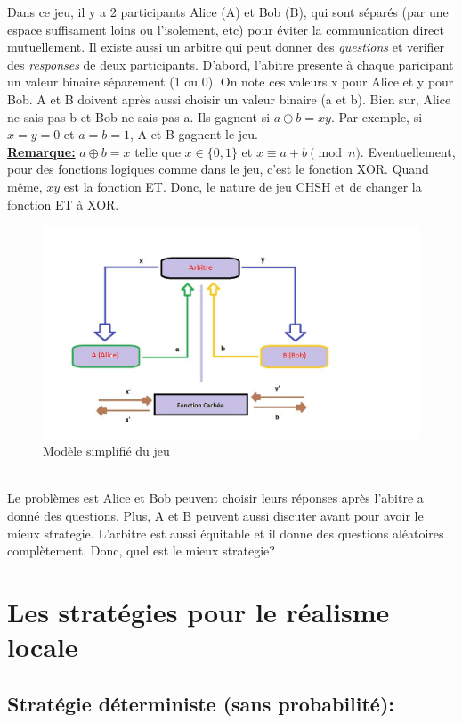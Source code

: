 \documentclass{article}
\begin{document}
Dans ce jeu, il y a 2 participants Alice (A) et Bob (B), qui sont séparés (par une espace suffisament loins ou l'isolement, etc) pour éviter la communication direct mutuellement. Il existe aussi un arbitre qui peut donner des \textit{questions} et verifier des \textit{responses} de deux participants. D'abord, l'abitre presente à chaque paricipant un valeur binaire séparement (1 ou 0). On note ces valeurs x pour Alice et y pour Bob. A et B doivent après aussi choisir un valeur binaire (a et b). Bien sur, Alice ne sais pas b et Bob ne sais pas a. Ils gagnent si $a \oplus b = xy$. Par exemple, si $x = y = 0$ et $a = b = 1$, A et B gagnent le jeu.
\\\textbf{\underline{Remarque:}} $a \oplus b = x$ telle que $x \in \{0,1\}$ et $x \equiv a + b \pmod{n}$. Eventuellement, pour des fonctions logiques comme dans le jeu, c'est le fonction XOR. Quand même, $xy$ est la fonction ET. Donc, le nature de jeu CHSH et de changer la fonction ET à XOR.
\begin{figure}[h]
\centering
\includegraphics[scale = 0.5]{Simplify model}
\centering
\caption{Modèle simplifié du jeu}
\end{figure}
\\Le problèmes est Alice et Bob peuvent choisir leurs réponses après l'abitre a donné des questions. Plus, A et B peuvent aussi discuter avant pour avoir le mieux strategie. L'arbitre est aussi équitable et il donne des questions aléatoires complètement. Donc, quel est le mieux strategie?


\section{Les stratégies pour le réalisme locale}

\subsection{Stratégie déterministe (sans probabilité):}
\end{document}
